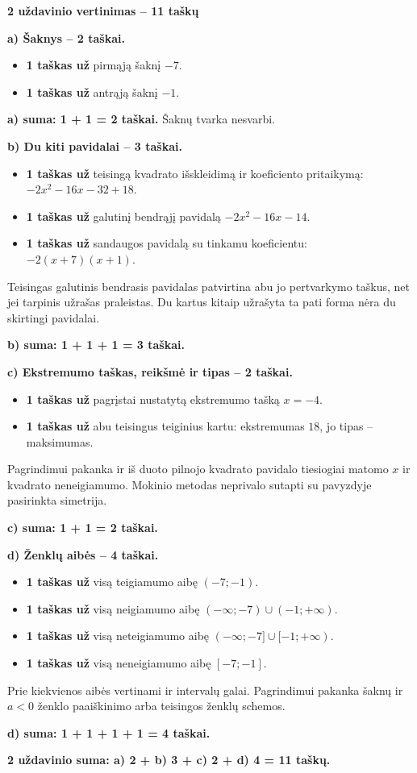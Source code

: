 \documentclass[11pt]{article}
\newcommand{\sk}[1]{\par\medskip\textbf{#1}\par}
\begin{document}
\sk{2 uždavinio vertinimas -- 11 taškų}
\textbf{a) Šaknys -- 2 taškai.}\begin{itemize}
\item \textbf{1 taškas už} pirmąją šaknį $-7$.
\item \textbf{1 taškas už} antrąją šaknį $-1$.
\end{itemize}
\textbf{a) suma: 1 + 1 = 2 taškai.} Šaknų tvarka nesvarbi.
\par\textbf{b) Du kiti pavidalai -- 3 taškai.}\begin{itemize}
\item \textbf{1 taškas už} teisingą kvadrato išskleidimą ir koeficiento pritaikymą: $-2x^2-16x-32+18$.
\item \textbf{1 taškas už} galutinį bendrąjį pavidalą $- 2 x^{2} - 16 x - 14$.
\item \textbf{1 taškas už} sandaugos pavidalą su tinkamu koeficientu: $-2(x+7)(x+1)$.
\end{itemize}
Teisingas galutinis bendrasis pavidalas patvirtina abu jo pertvarkymo taškus, net jei tarpinis užrašas praleistas. Du kartus kitaip užrašyta ta pati forma nėra du skirtingi pavidalai.\par\textbf{b) suma: 1 + 1 + 1 = 3 taškai.}
\par\textbf{c) Ekstremumo taškas, reikšmė ir tipas -- 2 taškai.}\begin{itemize}
\item \textbf{1 taškas už} pagrįstai nustatytą ekstremumo tašką $x=-4$.
\item \textbf{1 taškas už} abu teisingus teiginius kartu: ekstremumas $18$, jo tipas -- maksimumas.
\end{itemize}
Pagrindimui pakanka ir iš duoto pilnojo kvadrato pavidalo tiesiogiai matomo $x$ ir kvadrato neneigiamumo. Mokinio metodas neprivalo sutapti su pavyzdyje pasirinkta simetrija.\par\textbf{c) suma: 1 + 1 = 2 taškai.}
\par\textbf{d) Ženklų aibės -- 4 taškai.}\begin{itemize}
\item \textbf{1 taškas už} visą teigiamumo aibę $(-7;-1)$.
\item \textbf{1 taškas už} visą neigiamumo aibę $(-\infty;-7)\cup(-1;+\infty)$.
\item \textbf{1 taškas už} visą neteigiamumo aibę $(-\infty;-7]\cup[-1;+\infty)$.
\item \textbf{1 taškas už} visą neneigiamumo aibę $[-7;-1]$.
\end{itemize}
Prie kiekvienos aibės vertinami ir intervalų galai. Pagrindimui pakanka šaknų ir $a<0$ ženklo paaiškinimo arba teisingos ženklų schemos.\par\textbf{d) suma: 1 + 1 + 1 + 1 = 4 taškai.}\par\textbf{2 uždavinio suma: a) 2 + b) 3 + c) 2 + d) 4 = 11 taškų.}\newpage
\end{document}
